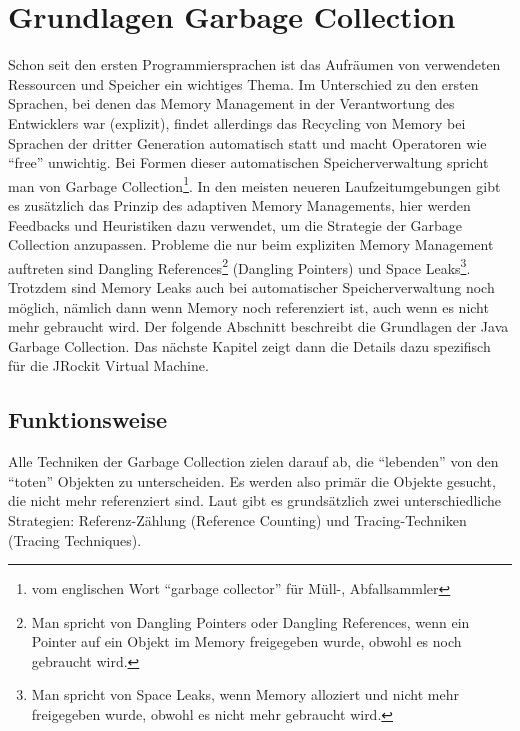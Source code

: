 \chapter{Grundlagen Garbage Collection}\label{grundlagen_gc}
Schon seit den ersten Programmiersprachen ist das Aufräumen von verwendeten Ressourcen und Speicher ein wichtiges Thema. Im Unterschied zu den ersten Sprachen, bei denen das Memory Management in der Verantwortung des Entwicklers war (explizit), findet allerdings das Recycling von Memory bei Sprachen der dritter Generation automatisch statt und macht Operatoren wie ``free'' unwichtig. Bei Formen dieser automatischen Speicherverwaltung spricht man von Garbage Collection\footnote{vom englischen Wort ``garbage collector'' für Müll-, Abfallsammler}. In den meisten neueren Laufzeitumgebungen gibt es zusätzlich das Prinzip  des adaptiven Memory Managements, hier werden Feedbacks und Heuristiken dazu verwendet, um die Strategie der Garbage Collection anzupassen.
Probleme die nur beim expliziten Memory Management auftreten sind  Dangling References\footnote{Man spricht von Dangling Pointers oder Dangling References, wenn ein Pointer auf ein Objekt im Memory freigegeben wurde, obwohl es noch gebraucht wird.} (Dangling Pointers) und Space Leaks\footnote{Man spricht von Space Leaks, wenn Memory alloziert und nicht mehr freigegeben wurde, obwohl es nicht mehr gebraucht wird.\cite{sunMemoryManagementWP}}. Trotzdem sind Memory Leaks auch bei automatischer Speicherverwaltung noch möglich, nämlich dann wenn Memory noch referenziert ist, auch wenn es nicht mehr gebraucht wird.
Der folgende Abschnitt beschreibt die Grundlagen der Java Garbage Collection. Das nächste Kapitel zeigt dann die Details dazu spezifisch für die JRockit Virtual Machine.

\section{Funktionsweise}
Alle Techniken der Garbage Collection zielen darauf ab, die ``lebenden'' von den ``toten'' Objekten zu unterscheiden. Es werden also primär die Objekte gesucht, die nicht mehr referenziert sind. Laut \cite[S. 77]{lagergren2010oracle} gibt es grundsätzlich zwei unterschiedliche Strategien: Referenz-Zählung (Reference Counting) und Tracing-Techniken (Tracing Techniques).

